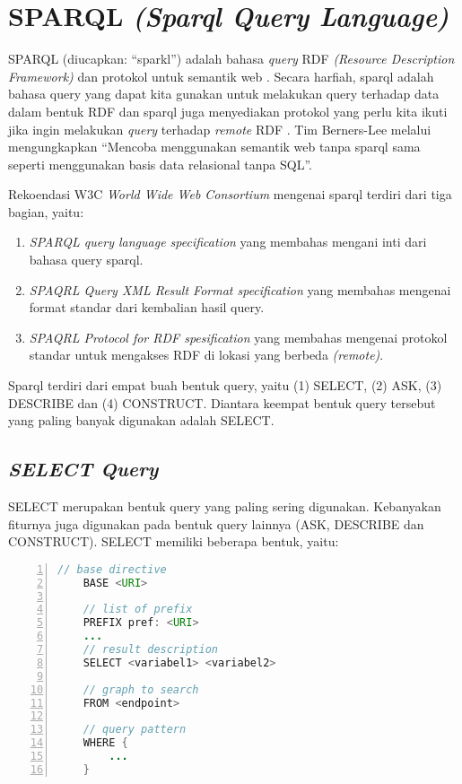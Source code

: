 \section{SPARQL \emph{(Sparql Query Language)}}
SPARQL (diucapkan: ``sparkl'') adalah bahasa \emph{query} RDF \emph{(Resource Description Framework)} dan protokol untuk semantik web \citep{liyang_yu}. Secara harfiah, sparql adalah bahasa query yang dapat kita gunakan untuk melakukan query terhadap data dalam bentuk RDF dan sparql juga menyediakan protokol yang perlu kita ikuti jika ingin melakukan \emph{query} terhadap \emph{remote} RDF \citep{liyang_yu}. Tim Berners-Lee melalui \citet{ducharme} mengungkapkan ``Mencoba menggunakan semantik web tanpa sparql sama seperti menggunakan basis data relasional tanpa SQL''.

Rekoendasi W3C \emph{World Wide Web Consortium} mengenai sparql terdiri dari tiga bagian, yaitu:

\begin{enumerate}
	\item \emph{SPARQL query language specification} yang membahas mengani inti dari bahasa query sparql.
	\item \emph{SPAQRL Query XML Result Format specification} yang membahas mengenai format standar dari kembalian hasil query.
	\item \emph{SPAQRL Protocol for RDF spesification} yang membahas mengenai protokol standar untuk mengakses RDF di lokasi yang berbeda \emph{(remote)}.
\end{enumerate}

Sparql terdiri dari empat buah bentuk query, yaitu (1) SELECT, (2) ASK, (3) DESCRIBE dan (4) CONSTRUCT. Diantara keempat bentuk query tersebut yang paling banyak digunakan adalah SELECT.

\subsection{\emph{SELECT Query}}
SELECT merupakan bentuk query yang paling sering digunakan. Kebanyakan fiturnya juga digunakan pada bentuk query lainnya (ASK, DESCRIBE dan CONSTRUCT). SELECT memiliki beberapa bentuk, yaitu:

\begin{lstlisting}[language=JAVA, xleftmargin=15pt, numbers=left]
 	// base directive
 	BASE <URI>

 	// list of prefix 
 	PREFIX pref: <URI>
 	...
 	// result description
 	SELECT <variabel1> <variabel2>

 	// graph to search
 	FROM <endpoint>

 	// query pattern
 	WHERE {
 		...
 	}
\end{lstlisting} 

